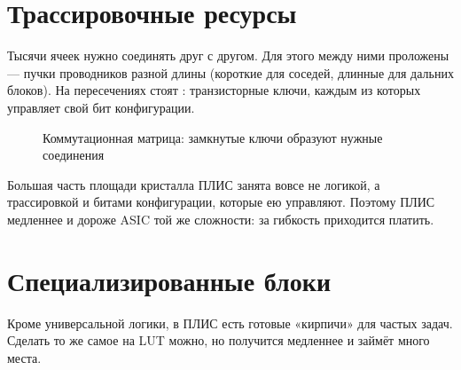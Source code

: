 \section{Трассировочные ресурсы}

Тысячи ячеек нужно соединять друг с другом. Для этого между ними проложены
 --- пучки проводников разной длины (короткие для
соседей, длинные для дальних блоков). На пересечениях стоят
: транзисторные ключи, каждым из которых
управляет свой бит конфигурации.

\begin{figure}[H]
\centering
{}
\caption{Коммутационная матрица: замкнутые ключи образуют нужные соединения}
\end{figure}

\begin{infobox}
Большая часть площади кристалла ПЛИС занята вовсе не логикой, а
трассировкой и битами конфигурации, которые ею управляют. Поэтому ПЛИС
медленнее и дороже ASIC той же сложности: за гибкость приходится платить.
\end{infobox}

\section{Специализированные блоки}

Кроме универсальной логики, в ПЛИС есть готовые «кирпичи» для частых задач.
Сделать то же самое на LUT можно, но получится медленнее и займёт много места.

